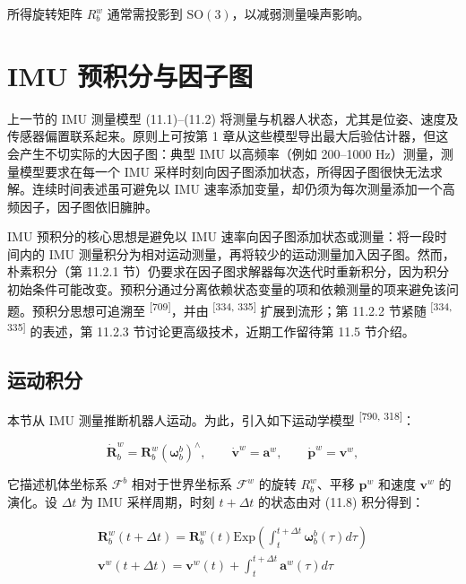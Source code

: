 所得旋转矩阵 $R_b^w$ 通常需投影到 $\mathrm{SO}(3)$，以减弱测量噪声影响。

\section{IMU 预积分与因子图}

上一节的 IMU 测量模型 (11.1)--(11.2) 将测量与机器人状态，尤其是位姿、速度及传感器偏置联系起来。原则上可按第 1 章从这些模型导出最大后验估计器，但这会产生不切实际的大因子图：典型 IMU 以高频率（例如 200--1000 Hz）测量，测量模型要求在每一个 IMU 采样时刻向因子图添加状态，所得因子图很快无法求解。连续时间表述虽可避免以 IMU 速率添加变量，却仍须为每次测量添加一个高频因子，因子图依旧臃肿。

IMU 预积分的核心思想是避免以 IMU 速率向因子图添加状态或测量：将一段时间内的 IMU 测量积分为相对运动测量，再将较少的运动测量加入因子图。然而，朴素积分（第 11.2.1 节）仍要求在因子图求解器每次迭代时重新积分，因为积分初始条件可能改变。预积分通过分离依赖状态变量的项和依赖测量的项来避免该问题。预积分思想可追溯至 \textsuperscript{[709]}，并由 \textsuperscript{[334, 335]} 扩展到流形；第 11.2.2 节紧随 \textsuperscript{[334, 335]} 的表述，第 11.2.3 节讨论更高级技术，近期工作留待第 11.5 节介绍。

\subsection{运动积分}

本节从 IMU 测量推断机器人运动。为此，引入如下运动学模型 \textsuperscript{[790, 318]}：

\begin{equation}
\dot {\boldsymbol {R}} _ {b} ^ {w} = \boldsymbol {R} _ {b} ^ {w} (\boldsymbol {\omega} _ {b} ^ {b}) ^ {\wedge}, \qquad \dot {\boldsymbol {v}} ^ {w} = \mathbf {a} ^ {w}, \qquad \dot {\boldsymbol {p}} ^ {w} = \boldsymbol {v} ^ {w},\tag{11.8}
\end{equation}

它描述机体坐标系 $\mathcal{F}^b$ 相对于世界坐标系 $\mathcal{F}^w$ 的旋转 $R_b^w$、平移 $\mathbf p^w$ 和速度 $\mathbf v^w$ 的演化。设 $\Delta t$ 为 IMU 采样周期，时刻 $t+\Delta t$ 的状态由对 (11.8) 积分得到：

\begin{equation}
\begin{array}{l} \pmb {R} _ {b} ^ {w} (t + \Delta t) = \pmb {R} _ {b} ^ {w} (t) \mathrm{Exp} \left(\int_ {t} ^ {t + \Delta t} \pmb {\omega} _ {b} ^ {b} (\tau) d \tau\right) \\ \pmb {v} ^ {w} (t + \Delta t) = \pmb {v} ^ {w} (t) + \int_ {t} ^ {t + \Delta t} \pmb {\mathbf {a}} ^ {w} (\tau) d \tau \end{array}\tag{11.9}
\end{equation}

